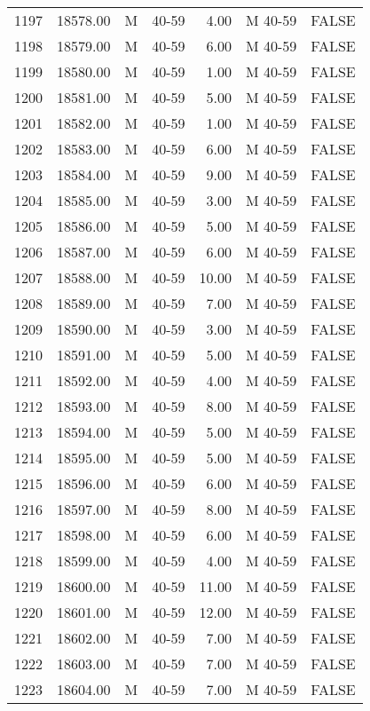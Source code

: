 \begin{table}[ht]
\begin{tabular}{rrllrll}
  1197 & 18578.00 & M & 40-59 & 4.00 & M 40-59 & FALSE \\ 
  1198 & 18579.00 & M & 40-59 & 6.00 & M 40-59 & FALSE \\ 
  1199 & 18580.00 & M & 40-59 & 1.00 & M 40-59 & FALSE \\ 
  1200 & 18581.00 & M & 40-59 & 5.00 & M 40-59 & FALSE \\ 
  1201 & 18582.00 & M & 40-59 & 1.00 & M 40-59 & FALSE \\ 
  1202 & 18583.00 & M & 40-59 & 6.00 & M 40-59 & FALSE \\ 
  1203 & 18584.00 & M & 40-59 & 9.00 & M 40-59 & FALSE \\ 
  1204 & 18585.00 & M & 40-59 & 3.00 & M 40-59 & FALSE \\ 
  1205 & 18586.00 & M & 40-59 & 5.00 & M 40-59 & FALSE \\ 
  1206 & 18587.00 & M & 40-59 & 6.00 & M 40-59 & FALSE \\ 
  1207 & 18588.00 & M & 40-59 & 10.00 & M 40-59 & FALSE \\ 
  1208 & 18589.00 & M & 40-59 & 7.00 & M 40-59 & FALSE \\ 
  1209 & 18590.00 & M & 40-59 & 3.00 & M 40-59 & FALSE \\ 
  1210 & 18591.00 & M & 40-59 & 5.00 & M 40-59 & FALSE \\ 
  1211 & 18592.00 & M & 40-59 & 4.00 & M 40-59 & FALSE \\ 
  1212 & 18593.00 & M & 40-59 & 8.00 & M 40-59 & FALSE \\ 
  1213 & 18594.00 & M & 40-59 & 5.00 & M 40-59 & FALSE \\ 
  1214 & 18595.00 & M & 40-59 & 5.00 & M 40-59 & FALSE \\ 
  1215 & 18596.00 & M & 40-59 & 6.00 & M 40-59 & FALSE \\ 
  1216 & 18597.00 & M & 40-59 & 8.00 & M 40-59 & FALSE \\ 
  1217 & 18598.00 & M & 40-59 & 6.00 & M 40-59 & FALSE \\ 
  1218 & 18599.00 & M & 40-59 & 4.00 & M 40-59 & FALSE \\ 
  1219 & 18600.00 & M & 40-59 & 11.00 & M 40-59 & FALSE \\ 
  1220 & 18601.00 & M & 40-59 & 12.00 & M 40-59 & FALSE \\ 
  1221 & 18602.00 & M & 40-59 & 7.00 & M 40-59 & FALSE \\ 
  1222 & 18603.00 & M & 40-59 & 7.00 & M 40-59 & FALSE \\ 
  1223 & 18604.00 & M & 40-59 & 7.00 & M 40-59 & FALSE \\ 

\end{tabular}
\end{table}
